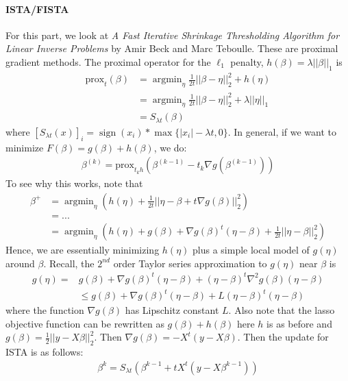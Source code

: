 \documentclass[12pt, leqno]{article}
\newcommand{\norm}[1]{\left|\left|#1\right|\right|}
\newcommand{\abs}[1]{\left|#1\right|}
\DeclareMathOperator*{\sign}{sign}
\DeclareMathOperator*{\argmin}{argmin}
\theoremstyle{remark}
\begin{document}
\pagebreak

\paragraph{ISTA/FISTA} For this part, we look at {\it A Fast
  Iterative Shrinkage Thresholding Algorithm
for Linear Inverse Problems} by Amir Beck and Marc Teboulle. These are
proximal gradient methods. The proximal operator for the $\ell_1$
penalty, $h(\beta) = \lambda \norm{\beta}_1$ is 
\begin{align*}
\text{prox}_t(\beta) &= \argmin_{\eta} \frac{1}{2t} \norm{\beta-\eta}_2^2 + h(\eta)
   \\
&= \argmin_{\eta} \frac{1}{2t} \norm{\beta-\eta}_2^2 +
  \lambda \norm{\eta}_1 \\
 &= S_{\lambda t} (\beta)
\end{align*}
where $[S_{\lambda t} (x)]_i = \sign (x_i)* \max\{ \abs{x_i} - \lambda
t, 0 \}$. In general, if we want to minimize $F(\beta) = g(\beta) + h(\beta)$, we do:
\begin{align*}
\beta^{(k)} = \text{prox}_{t_kh}(\beta^{(k-1)}-t_k \nabla g(\beta^{(k-1)}))
\end{align*}
To see why this works, note that
\begin{align*}
\beta^+ &= \argmin_{\eta} (h(\eta) + \frac{1}{2t} \norm{\eta - \beta + t \nabla g(\beta)}_2^2) \\
&= ...\\
&= \argmin_{\eta} (h(\eta) + g(\beta) + \nabla g(\beta)^t(\eta - \beta) + \frac{1}{2t} \norm{\eta - \beta}_2^2) 
\end{align*}
Hence, we are essentially minimizing $h(\eta)$ plus a simple local model of $g(\eta)$ around $\beta$. Recall, the $2^{nd}$ order Taylor series approximation to $g(\eta)$ near $\beta$ is 
\begin{align*}
g(\eta) =& g(\beta) + \nabla g(\beta)^t (\eta - \beta) + (\eta-\beta)^t \nabla^2 g(\beta) (\eta -\beta) \\
&\leq  g(\beta) + \nabla g(\beta)^t (\eta - \beta) + L (\eta-\beta)^t (\eta -\beta)
\end{align*}
where the function $\nabla g(\beta)$ has Lipschitz constant $L$.
Also note that the lasso objective function can be rewritten as
$g(\beta) + h(\beta)$ here $h$ is as before and $g(\beta) =
\frac{1}{2}\norm{y- X \beta}_2^2$. Then  $\nabla g(\beta) = -X^t (y -
X \beta)$. Then the update for ISTA is as follows:
\begin{align*}
\beta^{k} = S_{\lambda t} (\beta^{k-1} + t X^t (y -
X \beta^{k-1})) 
\end{align*}
\end{document}

